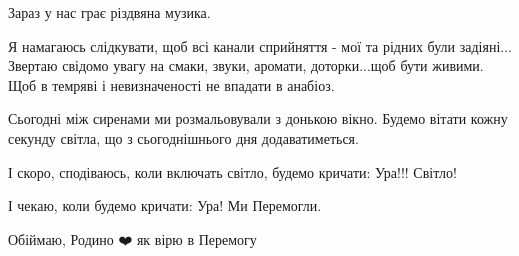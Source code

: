 Зараз у нас грає різдвяна музика. 

Я намагаюсь слідкувати, щоб всі канали сприйняття - мої та рідних були
задіяні... Звертаю свідомо увагу на смаки, звуки, аромати, доторки...щоб бути
живими. Щоб в темряві і невизначеності  не впадати в анабіоз. 

Сьогодні між сиренами ми розмальовували з донькою вікно. Будемо вітати кожну
секунду світла, що з сьогоднішнього дня додаватиметься. 

І скоро, сподіваюсь, коли включать світло, будемо кричати: Ура!!! Світло! 

І чекаю, коли будемо кричати: Ура! Ми Перемогли. 

Обіймаю, Родино ❤️ як вірю в Перемогу

